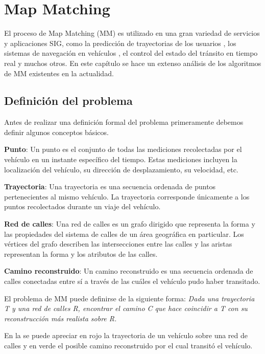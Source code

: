 \chapter{Map Matching}
\label{cap:4}

El proceso de Map Matching (MM) es utilizado en una gran variedad de servicios y aplicaciones SIG, como la predicción de trayectorias de los usuarios \cite{eisner2011algorithms}, los sistemas de navegación en vehículos \cite{kim2001adaptive}, el control del estado del tránsito en tiempo real \cite{thiagarajan2010cooperative, thiagarajan2009vtrack} y muchos otros. En este capítulo se hace un extenso análisis de los algoritmos de MM existentes en la actualidad.

\section{Definición del problema}

Antes de realizar una definición formal del problema primeramente debemos definir algunos conceptos básicos.

\textbf{Punto}: Un punto es el conjunto de todas las mediciones recolectadas por el vehículo en un instante específico del tiempo. Estas mediciones incluyen la localización del vehículo, su dirección de desplazamiento, su velocidad, etc.

\textbf{Trayectoria}: Una trayectoria es una secuencia ordenada de puntos pertenecientes al mismo vehículo. La trayectoria corresponde únicamente a los puntos recolectados durante un viaje del vehículo.

\textbf{Red de calles}: Una red de calles es un grafo dirigido que representa la forma y las propiedades del sistema de calles de un área geográfica en particular. Los vértices del grafo describen las intersecciones entre las calles y las aristas representan la forma y los atributos de las calles.

\textbf{Camino reconstruido}: Un camino reconstruido es una secuencia ordenada de calles conectadas entre sí a través de las cuáles el vehículo pudo haber transitado.

El problema de MM puede definirse de la siguiente forma: \emph{Dada una trayectoria T y una red de calles R, encontrar el camino C que hace coincidir a T con su reconstrucción más realista sobre R.}

En la  se puede apreciar en rojo la trayectoria de un vehículo sobre una red de calles y en verde el posible camino reconstruido por el cual transitó el vehículo.

